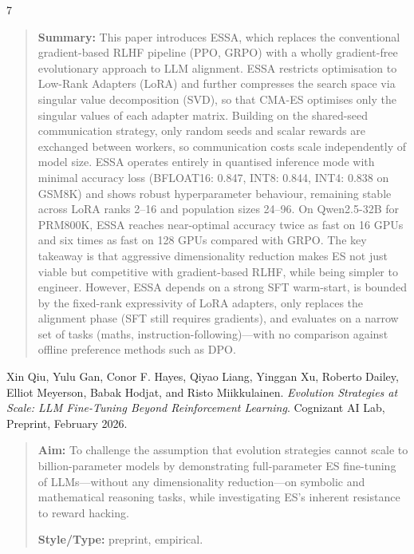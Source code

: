 \documentclass[12pt, a4paper]{article}
\begin{document}
\begin{thebibliography}{7}
\begin{quotation}
\textbf{Summary:} This paper introduces ESSA, which replaces the conventional gradient-based RLHF pipeline (PPO, GRPO) with a wholly gradient-free evolutionary approach to LLM alignment. ESSA restricts optimisation to Low-Rank Adapters (LoRA) and further compresses the search space via singular value decomposition (SVD), so that CMA-ES optimises only the singular values of each adapter matrix. Building on the shared-seed communication strategy, only random seeds and scalar rewards are exchanged between workers, so communication costs scale independently of model size. ESSA operates entirely in quantised inference mode with minimal accuracy loss (BFLOAT16: 0.847, INT8: 0.844, INT4: 0.838 on GSM8K) and shows robust hyperparameter behaviour, remaining stable across LoRA ranks 2--16 and population sizes 24--96. On Qwen2.5-32B for PRM800K, ESSA reaches near-optimal accuracy twice as fast on 16 GPUs and six times as fast on 128 GPUs compared with GRPO. The key takeaway is that aggressive dimensionality reduction makes ES not just viable but competitive with gradient-based RLHF, while being simpler to engineer. However, ESSA depends on a strong SFT warm-start, is bounded by the fixed-rank expressivity of LoRA adapters, only replaces the alignment phase (SFT still requires gradients), and evaluates on a narrow set of tasks (maths, instruction-following)---with no comparison against offline preference methods such as DPO.
\end{quotation}

Xin Qiu, Yulu Gan, Conor F. Hayes, Qiyao Liang, Yinggan Xu, Roberto Dailey, Elliot Meyerson, Babak Hodjat, and Risto Miikkulainen.
\textit{Evolution Strategies at Scale: LLM Fine-Tuning Beyond Reinforcement Learning}.
Cognizant AI Lab, Preprint, February 2026.

\begin{quotation}
\noindent
\textbf{Aim:} To challenge the assumption that evolution strategies cannot scale to billion-parameter models by demonstrating full-parameter ES fine-tuning of LLMs---without any dimensionality reduction---on symbolic and mathematical reasoning tasks, while investigating ES's inherent resistance to reward hacking.

\textbf{Style/Type:} preprint, empirical.


\end{quotation}
\end{thebibliography}
\end{document}
